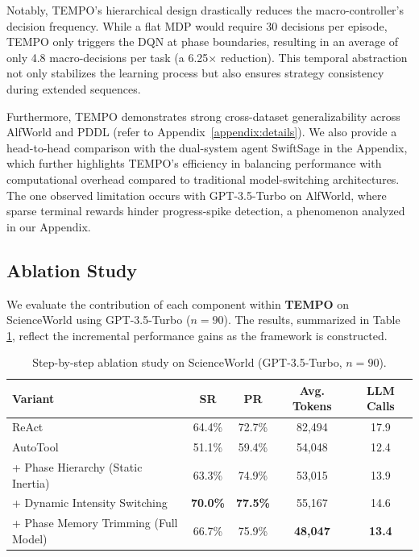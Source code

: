 \documentclass[runningheads]{llncs}
\begin{document}
Notably, TEMPO's hierarchical design drastically reduces the macro-controller's decision frequency. While a flat MDP would require 30 decisions per episode, TEMPO only triggers the DQN at phase boundaries, resulting in an average of only 4.8 macro-decisions per task (a 6.25$\times$ reduction). This temporal abstraction not only stabilizes the learning process but also ensures strategy consistency during extended sequences. 

Furthermore, TEMPO demonstrates strong cross-dataset generalizability across AlfWorld and PDDL (refer to Appendix~\ref{appendix:details}). We also provide a head-to-head comparison with the dual-system agent SwiftSage \cite{swiftsage} in the Appendix, which further highlights TEMPO's efficiency in balancing performance with computational overhead compared to traditional model-switching architectures. The one observed limitation occurs with GPT-3.5-Turbo on AlfWorld, where sparse terminal rewards hinder progress-spike detection, a phenomenon analyzed in our Appendix.



\subsection{Ablation Study}

We evaluate the contribution of each component within \textbf{TEMPO} on ScienceWorld using GPT-3.5-Turbo ($n=90$). The results, summarized in Table \ref{tab:ablation_step}, reflect the incremental performance gains as the framework is constructed.

\begin{table}[htb]
\centering
\small
\caption{Step-by-step ablation study on ScienceWorld (GPT-3.5-Turbo, $n=90$).}
\label{tab:ablation_step}
\begin{tabular}{lcccc}
\toprule
\textbf{Variant} & \textbf{SR} & \textbf{PR} & \textbf{Avg. Tokens} & \textbf{LLM Calls} \\
\midrule
ReAct & 64.4\% & 72.7\% & 82,494 & 17.9 \\
AutoTool & 51.1\% & 59.4\% & 54,048 & 12.4 \\
\midrule
+ Phase Hierarchy (Static Inertia) & 63.3\% & 74.9\% & 53,015 & 13.9 \\
+ Dynamic Intensity Switching & \textbf{70.0\%} & \textbf{77.5\%} & 55,167 & 14.6 \\
+ Phase Memory Trimming (Full Model) & 66.7\% & 75.9\% & \textbf{48,047} & \textbf{13.4} \\
\bottomrule
\end{tabular}
\end{table}
\end{document}
